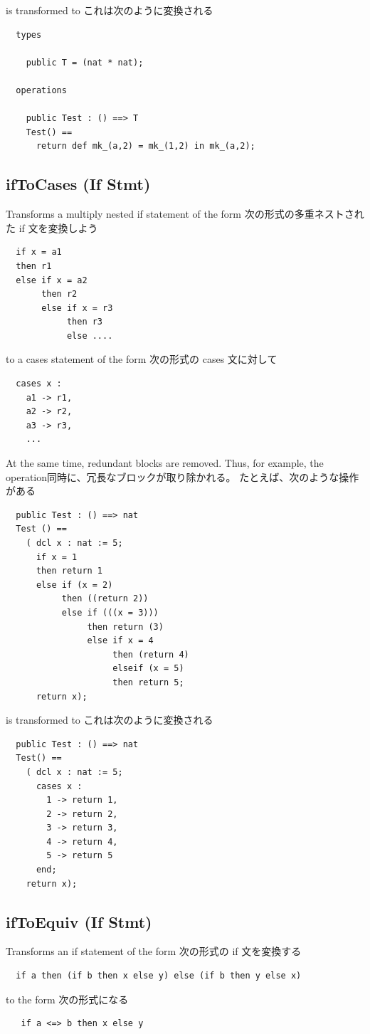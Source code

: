 \documentclass[\pformat,12pt]{jarticle}
\begin{document}
is transformed to
これは次のように変換される

\begin{verbatim}
  types

    public T = (nat * nat);

  operations

    public Test : () ==> T
    Test() ==
      return def mk_(a,2) = mk_(1,2) in mk_(a,2);
\end{verbatim}

\subsection{ifToCases (If Stmt)}
  Transforms a multiply nested if statement of the form
  次の形式の多重ネストされた if 文を変換しよう
\begin{verbatim}
  if x = a1
  then r1
  else if x = a2
       then r2
       else if x = r3
            then r3
            else ....
\end{verbatim}

to a cases statement of the form
次の形式の cases 文に対して
\begin{verbatim}
  cases x :
    a1 -> r1,
    a2 -> r2,
    a3 -> r3,
    ...
\end{verbatim}
At the same time, redundant blocks are removed. Thus, for example, the operation同時に、冗長なブロックが取り除かれる。
たとえば、次のような操作がある

\begin{verbatim}
  public Test : () ==> nat  
  Test () ==
    ( dcl x : nat := 5;
      if x = 1 
      then return 1
      else if (x = 2) 
           then ((return 2))
           else if (((x = 3))) 
                then return (3) 
                else if x = 4 
                     then (return 4)
                     elseif (x = 5)
                     then return 5; 
      return x);
\end{verbatim}
is transformed to
これは次のように変換される
\begin{verbatim}
  public Test : () ==> nat
  Test() == 
    ( dcl x : nat := 5;
      cases x :
        1 -> return 1,
        2 -> return 2,
        3 -> return 3,
        4 -> return 4,
        5 -> return 5
      end;
    return x);
\end{verbatim}


\subsection{ifToEquiv (If Stmt)}
  Transforms an if statement of the form 
  次の形式の if 文を変換する 
\begin{verbatim}
  if a then (if b then x else y) else (if b then y else x) 
\end{verbatim}    
to the form
次の形式になる
\begin{verbatim} 
   if a <=> b then x else y
\end{verbatim}
\end{document}
